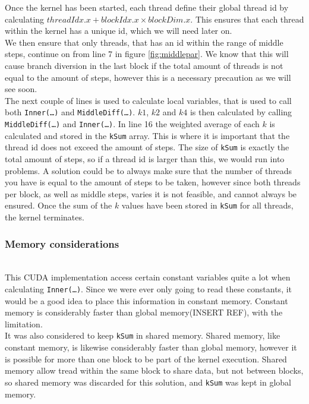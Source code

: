 Once the kernel has been started, each thread define their global thread id by calculating $threadIdx.x + blockIdx.x \times blockDim.x$. This ensures that each thread within the kernel has a unique id, which we will need later on.\\

We then ensure that only threads, that has an id within the range of middle steps, continue on from line 7 in figure \ref{fig:middlepar}. We know that this will cause branch diversion in the last block if the total amount of threads is not equal to the amount of steps, however this is a necessary precaution as we will see soon.\\

The next couple of lines is used to calculate local variables, that is used to call both \texttt{Inner(…)} and \texttt{MiddleDiff(…)}. $k1$, $k2$ and $k4$ is then calculated by calling \texttt{MiddleDiff(…)} and \texttt{Inner(…)}. In line 16 the weighted average of each $k$ is calculated and stored in the \texttt{kSum} array. This is where it is important that the thread id does not exceed the amount of steps. The size of \texttt{kSum} is exactly the total amount of steps, so if a thread id is larger than this, we would run into problems. A solution could be to always make sure that the number of threads you have is equal to the amount of steps to be taken, however since both threads per block, as well as middle steps, varies it is not feasible, and cannot always be ensured. Once the sum of the $k$ values have been stored in \texttt{kSum} for all threads, the kernel terminates.

\subsubsection{Memory considerations} \hfill \\
This CUDA implementation access certain constant variables quite a lot when calculating \texttt{Inner(…)}. Since we were ever only going to read these constants, it would be a good idea to place this information in constant memory. Constant memory is considerably faster than global memory(INSERT REF), with the limitation.\\

It was also considered to keep \texttt{kSum} in shared memory. Shared memory, like constant memory, is likewise considerably faster than global memory, however it is possible for more than one block to be part of the kernel execution. Shared memory allow tread within the same block to share data, but not between blocks, so shared memory was discarded for this solution, and \texttt{kSum} was kept in global memory.

